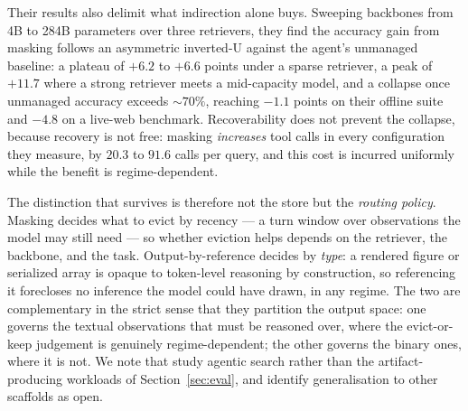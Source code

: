 \documentclass[11pt]{article}
\begin{document}
Their results also delimit what indirection alone buys. Sweeping backbones from 4B to 284B parameters over three retrievers, they find the accuracy gain from masking follows an asymmetric inverted-U against the agent's unmanaged baseline: a plateau of $+6.2$ to $+6.6$ points under a sparse retriever, a peak of $+11.7$ where a strong retriever meets a mid-capacity model, and a collapse once unmanaged accuracy exceeds ${\sim}70\%$, reaching $-1.1$ points on their offline suite and $-4.8$ on a live-web benchmark. Recoverability does not prevent the collapse, because recovery is not free: masking \emph{increases} tool calls in every configuration they measure, by $20.3$ to $91.6$ calls per query, and this cost is incurred uniformly while the benefit is regime-dependent.

The distinction that survives is therefore not the store but the \emph{routing policy}. Masking decides what to evict by recency --- a turn window over observations the model may still need --- so whether eviction helps depends on the retriever, the backbone, and the task. Output-by-reference decides by \emph{type}: a rendered figure or serialized array is opaque to token-level reasoning by construction, so referencing it forecloses no inference the model could have drawn, in any regime. The two are complementary in the strict sense that they partition the output space: one governs the textual observations that must be reasoned over, where the evict-or-keep judgement is genuinely regime-dependent; the other governs the binary ones, where it is not. We note that \citet{regimemap} study agentic search rather than the artifact-producing workloads of Section~\ref{sec:eval}, and identify generalisation to other scaffolds as open.

\begin{table}[htbp]\centering
\caption{Output-context strategies compared.}\label{tab:strategies}
\end{table}
\end{document}
